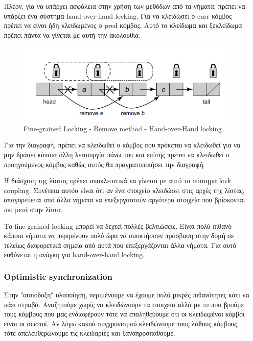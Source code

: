 \documentclass[../final_report.tex]{subfiles}
\begin{document}
Πλέον, για να υπάρχει ασφάλεια στην χρήση των μεθόδων από τα νήματα, πρέπει να υπάρξει ένα σύστημα hand-over-hand locking. 
Για να κλειδώσει ο curr κόμβος πρέπει να είναι ήδη κλειδωμένος ο pred κόμβος. Αυτό το κλείδωμα και ξεκλείδωμα πρέπει πάντα να γίνεται
με αυτή την ακολουθία.
\begin{figure}[H]
    \centering
        \includegraphics[scale=0.7]{fglRemove.png}
    \caption{Fine-grained Locking - Remove method - Hand-over-Hand locking}
    \label{fig:Fine-grained Locking - Remove method - Hand-over-Hand locking}
\end{figure}

Για την διαγραφή, πρέπει να κλειδωθεί ο κόμβος που πρόκεται να κλειδωθεί για να μην δράσει κάποια άλλη λειτουργία πάνω του και επίσης
πρέπει να κλειδωθεί ο προηγούμενος κόμβος καθώς αυτός θα πραγματοποιήσει την διαγραφή.

Η διάσχιση της λίστας πρέπει αποκλειστικά να γίνεται με αυτό το σύστημα lock coupling. Συνέπεια αυτόυ είναι ότι αν ένα στοιχείο κλειδώσει
στις αρχές της λίστας, απαγορεύεται από άλλα νήματα να επεξεργαστούν αργότερα στοιχεία που βρίσκονται πιο μετά στην λίστα.

Το fine-grained locking μπορεί να δεχτεί πολλές βελτιώσεις. Είναι πολύ πιθανό κάποια νήματα να περιμένουν πολύ
ώρα να αποκτήσουν πρόσβαση στην δομή σε τελείως διαφορετικά σημεία από αυτά που επεξεργάζονται άλλα νήματα.
Για αυτό ευθύνεται η ανάγκη για hand-over-hand locking.

\subsubsection{Optimistic synchronization}
Στην "αισιόδοξη" υλοποίηση, περιμένουμε να έχουμε πολύ μικρές πιθανότητες κάτι να πάει στραβά. Αναζητούμε χωρίς να 
κλειδώνουμε τα στοιχεία αλλά με το που βρούμε τους κόμβους που μας ενδιαφέρουν τότε να επαληθεύουμε ότι οι κλειδωμένοι
κόμβοι είναι οι σωστοί. Αν λόγω κακού συγχρονισμού κλειδώνουμε τους λάθους κόμβους, τότε απελευθερώνουμε τις κλειδαριές και
ξαναπροσπαθούμε.
\end{document}
